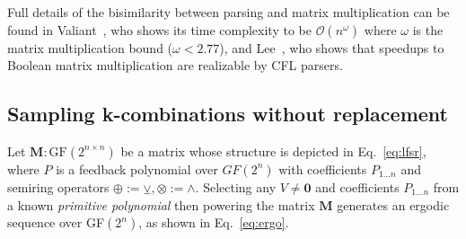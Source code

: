\documentclass[sigplan,review,anonymous,acmsmall]{acmart}\settopmatter{printfolios=false,printccs=false,printacmref=false}
\begin{document}

    \noindent Full details of the bisimilarity between parsing and matrix multiplication can be found in Valiant~\cite{valiant1975general}, who shows its time complexity to be $\mathcal{O}(n^\omega)$ where $\omega$ is the matrix multiplication bound ($\omega < 2.77$), and Lee~\cite{lee2002fast}, who shows that speedups to Boolean matrix multiplication are realizable by CFL parsers. %

    \subsection{Sampling k-combinations without replacement}

    \noindent Let $\textbf{M}: \text{GF}(2^{n\times n})$ be a matrix whose structure is depicted in Eq.~\ref{eq:lfsr}, where $P$ is a feedback polynomial over $GF(2^n)$ with coefficients $P_{1\ldots n}$ and semiring operators $\oplus := \veebar, \otimes := \land$. Selecting any $V \neq \mathbf{0}$ and coefficients $P_{1\ldots n}$ from a known \textit{primitive polynomial} then powering the matrix $\mathbf{M}$ generates an ergodic sequence over GF$(2^n)$, as shown in Eq.~\ref{eq:ergo}.\vspace{-10pt}
\end{document}
